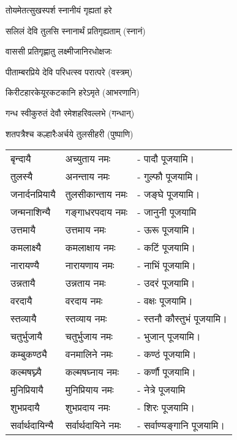 \begin{center}
{तोयमेतत्सुखस्पर्श स्नानीयं गृह्यतां हरे }

{सलिलं देवि तुलसि स्नानार्थं प्रतिगृह्यताम्}
(स्नानं)

{वाससी प्रतिगृह्णातु लक्ष्मीजानिरधोक्षजः}

{पीताम्बरप्रिये देवि परिधत्स्व परात्परे}
(वस्त्रम्)

{किरीटहारकेयूरकटकानि हरेऽमृते}
(आभरणानि)

{गन्ध स्वीकुरुतं देवौ रमेशहरिवल्लभे}
(गन्धान्)

{शतपत्रैश्च कल्हारैःअर्चये तुलसीहरी}
(पुष्पाणि) 
\end{center}



\begin{tabular}{ll@{}l}
बृन्दायै &  अच्युताय नमः & - पादौ पूजयामि।\\
तुलस्यै & अनन्ताय   नमः  &- गुल्फौ पूजयामि।\\
जनार्दनप्रियायै &  तुलसीकान्ताय नमः & - जङ्घे पूजयामि।\\
जन्मनाशिन्यै &  गङ्गाधरपदाय नमः & - जानुनी पूजयामि \\
उत्तमायै &  उत्तमाय नमः & - ऊरू पूजयामि।\\
कमलाक्ष्यै &  कमलाक्षाय नमः & - कटिं पूजयामि।\\
नारायण्यै &  नारायणाय नमः & - नाभिं पूजयामि।\\
उन्नतायै &  उन्नताय नमः & - उदरं पूजयामि।\\
वरदायै &  वरदाय नमः & - वक्षः पूजयामि।\\
स्तव्यायै &  स्तव्याय नमः & - स्तनौ कौस्तुभं पूजयामि।\\
चतुर्भुजायै &  चतुर्भुजाय नमः & - भुजान् पूजयामि।\\
कम्बुकण्ठ्यै &  वनमालिने नमः & - कण्ठं पूजयामि।\\
कल्मषघ्न्यै &  कल्मषघ्नाय नमः & - कर्णौ पूजयामि।\\
मुनिप्रियायै &  मुनिप्रियाय नमः & - नेत्रे पूजयामि\\
शुभप्रदायै &  शुभप्रदाय नमः & - शिरः पूजयामि।\\
सर्वार्थदायिन्यै &  सर्वार्थदायिने नमः & - सर्वाण्यङ्गानि पूजयामि। \\
\end{tabular}


